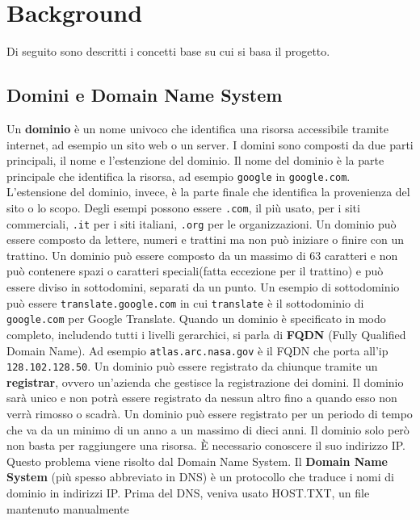 \documentclass[12pt,a4paper,openright,twoside]{book}
\begin{document}

\chapter{Background}

Di seguito sono descritti i concetti base su cui si basa il progetto.

\section{Domini e Domain Name System}
Un \textbf{dominio} è un nome univoco che identifica una risorsa accessibile tramite internet, ad esempio un sito web o un server.
I domini sono composti da due parti principali, il nome e l'estenzione del dominio.
Il nome del dominio è la parte principale che identifica la risorsa,
ad esempio \texttt{google} in \texttt{google.com}.
L'estensione del dominio, invece, è la parte finale
che identifica la provenienza del sito o lo scopo. Degli esempi possono essere
\texttt{.com}, il più usato, per i siti commerciali,
\texttt{.it} per i siti italiani, \texttt{.org} per le organizzazioni.
Un dominio può essere composto da lettere, numeri e trattini
ma non può iniziare o finire con un trattino.
Un dominio può essere composto da un massimo di 63 caratteri
e non può contenere spazi o caratteri speciali(fatta eccezione per il trattino) e
può essere diviso in sottodomini, separati da un punto.
Un esempio di sottodominio può essere \texttt{translate.google.com} in cui
\texttt{translate} è il sottodominio di \texttt{google.com} per Google Translate.
Quando un dominio è specificato in modo completo, includendo tutti i livelli gerarchici,
si parla di \textbf{FQDN} (Fully Qualified Domain Name).
Ad esempio \texttt{atlas.arc.nasa.gov} è il FQDN che porta all'ip \texttt{128.102.128.50}\cite{rfc1594}.
Un dominio può essere registrato da chiunque tramite
un \textbf{registrar}, ovvero
un'azienda che gestisce la registrazione dei domini.
Il dominio sarà unico e non potrà essere registrato da nessun altro
fino a quando esso non verrà rimosso o scadrà.
Un dominio può essere registrato per un periodo di tempo
che va da un minimo di un anno a un massimo di dieci anni.
Il dominio solo però non basta per raggiungere una risorsa.
È necessario conoscere il suo indirizzo IP.
Questo problema viene risolto dal Domain Name System. \hfill \break
Il \textbf{Domain Name System} (più spesso abbreviato in DNS)
è un protocollo che traduce i nomi di dominio in indirizzi IP.
Prima del DNS, veniva usato HOST.TXT, un file mantenuto manualmente
\end{document}
